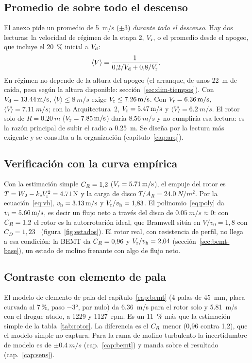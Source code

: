 \subsection{Promedio de \texorpdfstring{}{C4} sobre todo el descenso}\label{sec:dim-prom}
El anexo pide un promedio de \SI{5}{m/s} ($\pm3$) \emph{durante todo el descenso}. Hay dos
lecturas: la velocidad de régimen de la etapa 2, $V_{\mathrm{r}}$, o el promedio desde el apogeo, que
incluye el \SI{20}{\percent} inicial a $V_{\mathrm{d}}$:
\begin{equation}
  \langle V\rangle=\frac{1}{0{,}2/V_{\mathrm{d}}+0{,}8/V_{\mathrm{r}}}.
  \label{eq:promedio}
\end{equation}
En régimen no depende de la altura del apogeo (el arranque, de unos \SI{22}{m} de caída, pesa
según la altura disponible: sección~\ref{sec:dim-tiempos}). Con $V_{\mathrm{d}}=\SI{13.44}{m/s}$, $\langle V\rangle\le\SI{8}{m/s}$
exige $V_{\mathrm{r}}\le\SI{7.26}{m/s}$. Con $V_{\mathrm{r}}=\SI{6.36}{m/s}$, $\langle V\rangle=\SI{7.11}{m/s}$; con
la Arquitectura~2, $V_{\mathrm{r}}=\SI{5.47}{m/s}$ y $\langle V\rangle=\SI{6.2}{m/s}$. El rotor solo de
$R=\SI{0.20}{m}$ ($V_{\mathrm{r}}=\SI{7.85}{m/s}$) daría $\SI{8.56}{m/s}$ y no cumpliría esa lectura:
es la razón principal de subir el radio a \SI{0.25}{m}. Se diseña por la lectura más
exigente y se consulta a la organización (capítulo~\ref{cap:arq}).

\subsection{Verificación con la curva empírica}
Con la estimación simple $C_{R}=1{,}2$ ($V_{\mathrm{r}}=\SI{5.71}{m/s}$), el empuje del rotor es
$T=W_2-k_cV_{\mathrm{r}}^2=\SI{4.71}{N}$ y la carga de disco $T/A_R=\SI{24.0}{N/m^2}$. Por la
ecuación~\eqref{eq:vh}, $v_{\mathrm{h}}=\SI{3.13}{m/s}$ y $V_{\mathrm{r}}/v_{\mathrm{h}}=1{,}83$. El polinomio~\eqref{eq:poly}
da $v_{\mathrm{i}}=\SI{5.66}{m/s}$, es decir un flujo neto a través del disco de
$\SI{0.05}{m/s}\approx0$: con $C_{R}=1{,}2$ el rotor es la autorrotación ideal, que Bramwell
sitúa en $V/v_0=1{,}8$ con $C_D=1{,}23$~\cite[\S2.3, p.~44]{bramwell2001}
(figura~\ref{fig:estados}). El rotor real, con resistencia de perfil, no llega a esa
condición: la BEMT da $C_{R}=0{,}96$ y $V_{\mathrm{r}}/v_{\mathrm{h}}=2{,}04$ (sección~\ref{sec:bemt-base}), un
estado de molino frenante con algo de flujo neto.

\subsection{Contraste con elemento de pala}
El modelo de elemento de pala del capítulo~\ref{cap:bemt} (4 palas de \SI{45}{mm}, placa curvada al
7\,\%, paso $\ang{-3}$, par nulo) da \SI{6.36}{m/s} para el rotor solo y \SI{5.81}{m/s}
con el drogue atado, a \num{1229} y \num{1127}~rpm. Es un \SI{11}{\percent} más que la
estimación simple de la tabla~\ref{tab:rotor}. La diferencia es el $C_{R}$ menor (0,96 contra
1,2), que el modelo simple no captura. Para la rama de molino turbulento la
incertidumbre de modelo es de $\pm\SI{0.4}{m/s}$ (cap.~\ref{cap:bemt}) y manda sobre
el resultado (cap.~\ref{cap:sens}).

